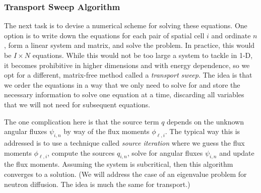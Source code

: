 \subsubsection{Transport Sweep Algorithm}

The next task is to devise a numerical scheme for solving these equations. One option is to write down the equations for each pair of spatial cell $i$ and ordinate $n$, form a linear system and matrix, and solve the problem. In practice, this would be $I \times N$ equations. While this would not be too large a system to tackle in 1-D, it becomes prohibitive in higher dimensions and with energy dependence, so we opt for a different, matrix-free method called a \emph{transport sweep}. The idea is that we order the equations in a way that we only need to solve for and store the necessary information to solve one equation at a time, discarding all variables that we will not need for subsequent equations.

The one complication here is that the source term $q$ depends on the unknown angular fluxes $\psi_{i,n}$ by way of the flux moments $\phi_{\ell,i}$. The typical way this is addressed is to use a technique called \emph{source iteration} where we guess the flux moments $\phi_{\ell,i}$, compute the sources $q_{i,n}$, solve for angular fluxes $\psi_{i,n}$ and update the flux moments. Assuming the system is subcritical, then this algorithm converges to a solution. (We will address the case of an eigenvalue problem for neutron diffusion. The idea is much the same for transport.)

